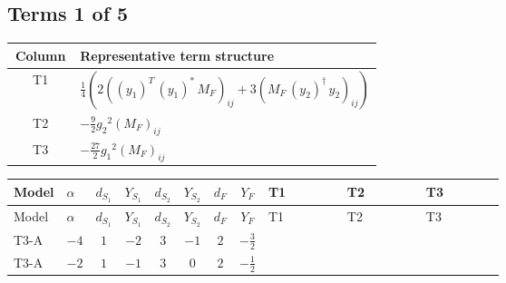 \documentclass[8pt]{article}
\begin{document}
\begin{landscape}
\subsection*{Terms 1 of 5}
\begin{center}
\begin{tabular}{@{}c >{\raggedright\arraybackslash}p{0.82\linewidth}@{}}
\toprule
Column & Representative term structure \\
\midrule
T1 & \(\displaystyle \frac{1}{4} (2 \left(\left({y_1}\right)^{T}\,\left({y_1}\right)^{*}\,{M_F}\right)_{ij}+3 \left({M_F}\,\left({y_2}\right)^{\dagger}\,{y_2}\right)_{ij})\) \\
\midrule
T2 & \(\displaystyle -\frac{9}{2} {g_2}^2 \left({M_F}\right)_{ij}\) \\
\midrule
T3 & \(\displaystyle -\frac{27}{2} {g_1}^2 \left({M_F}\right)_{ij}\) \\
\midrule
\bottomrule
\end{tabular}
\end{center}
\smallskip
\tiny
\begin{longtable}{@{}llcccccc >{\raggedright\arraybackslash}p{0.21\linewidth} >{\raggedright\arraybackslash}p{0.21\linewidth} >{\raggedright\arraybackslash}p{0.21\linewidth}@{}}
\toprule
Model & $\alpha$ & $d_{S_1}$ & $Y_{S_1}$ & $d_{S_2}$ & $Y_{S_2}$ & $d_F$ & $Y_F$ & T1 & T2 & T3 \\
\midrule
\endfirsthead
\toprule
Model & $\alpha$ & $d_{S_1}$ & $Y_{S_1}$ & $d_{S_2}$ & $Y_{S_2}$ & $d_F$ & $Y_F$ & T1 & T2 & T3 \\
\midrule
\endhead
T3-A & $-4$ & $1$ & $-2$ & $3$ & $-1$ & $2$ & $-\frac{3}{2}$ & \scriptsize\adjustbox{max width=\linewidth}{$\begin{gathered} \frac{1}{4} (2 \left(\left({y_1}\right)^{T}\,\left({y_1}\right)^{*}\,{M_F}\right)_{ij}+3 \left({M_F}\,\left({y_2}\right)^{\dagger}\,{y_2}\right)_{ij})\end{gathered}$} & \scriptsize\adjustbox{max width=\linewidth}{$\begin{gathered} -\frac{9}{2} {g_2}^2 \left({M_F}\right)_{ij}\end{gathered}$} & \scriptsize\adjustbox{max width=\linewidth}{$\begin{gathered} -\frac{27}{2} {g_1}^2 \left({M_F}\right)_{ij}\end{gathered}$} \\
\midrule
T3-A & $-2$ & $1$ & $-1$ & $3$ & $0$ & $2$ & $-\frac{1}{2}$ & \scriptsize\adjustbox{max width=\linewidth}{$\begin{gathered} \frac{1}{4} (2 \left(\left({y_1}\right)^{T}\,\left({y_1}\right)^{*}\,{M_F}\right)_{ij}+3 \left({M_F}\,\left({y_2}\right)^{\dagger}\,{y_2}\right)_{ij})\end{gathered}$} & \scriptsize\adjustbox{max width=\linewidth}{$\begin{gathered} -\frac{9}{2} {g_2}^2 \left({M_F}\right)_{ij}\end{gathered}$} & \scriptsize\adjustbox{max width=\linewidth}{$\begin{gathered} -\frac{3}{2} {g_1}^2 \left({M_F}\right)_{ij}\end{gathered}$} \\

\end{longtable}
\end{landscape}
\end{document}
